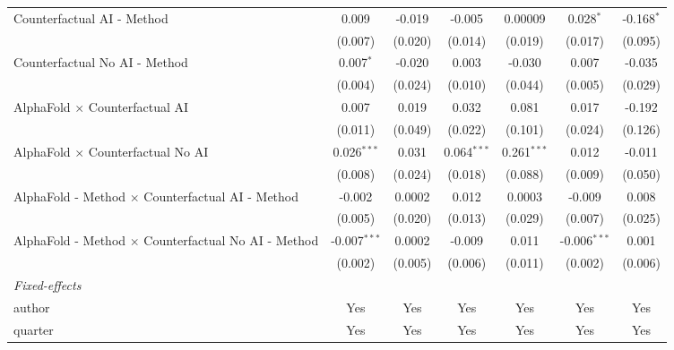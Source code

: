 \begin{tabular}{lcccccc}
   Counterfactual AI - Method                                 & 0.009          & -0.019  & -0.005        & 0.00009       & 0.028$^{*}$    & -0.168$^{*}$\\   
                                                              & (0.007)        & (0.020) & (0.014)       & (0.019)       & (0.017)        & (0.095)\\   
   Counterfactual No AI - Method                              & 0.007$^{*}$    & -0.020  & 0.003         & -0.030        & 0.007          & -0.035\\   
                                                              & (0.004)        & (0.024) & (0.010)       & (0.044)       & (0.005)        & (0.029)\\   
   AlphaFold $\times$ Counterfactual AI                       & 0.007          & 0.019   & 0.032         & 0.081         & 0.017          & -0.192\\   
                                                              & (0.011)        & (0.049) & (0.022)       & (0.101)       & (0.024)        & (0.126)\\   
   AlphaFold $\times$ Counterfactual No AI                    & 0.026$^{***}$  & 0.031   & 0.064$^{***}$ & 0.261$^{***}$ & 0.012          & -0.011\\   
                                                              & (0.008)        & (0.024) & (0.018)       & (0.088)       & (0.009)        & (0.050)\\   
   AlphaFold - Method $\times$ Counterfactual AI - Method     & -0.002         & 0.0002  & 0.012         & 0.0003        & -0.009         & 0.008\\   
                                                              & (0.005)        & (0.020) & (0.013)       & (0.029)       & (0.007)        & (0.025)\\   
   AlphaFold - Method $\times$ Counterfactual No AI - Method  & -0.007$^{***}$ & 0.0002  & -0.009        & 0.011         & -0.006$^{***}$ & 0.001\\   
                                                              & (0.002)        & (0.005) & (0.006)       & (0.011)       & (0.002)        & (0.006)\\   
   \midrule
   \emph{Fixed-effects}\\
   author                                                     & Yes            & Yes     & Yes           & Yes           & Yes            & Yes\\  
   quarter                                                    & Yes            & Yes     & Yes           & Yes           & Yes            & Yes\\  

\end{tabular}
